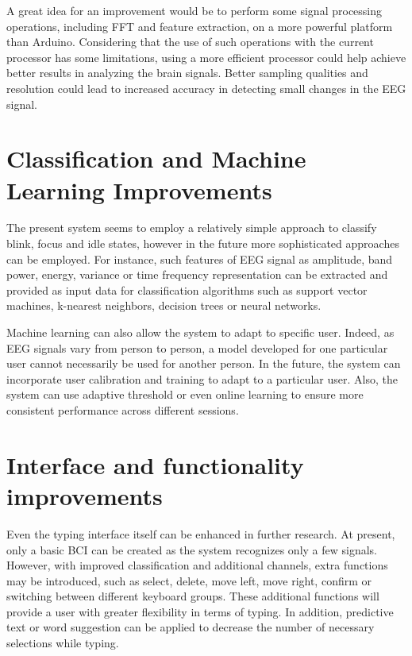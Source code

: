 A great idea for an improvement would be to perform some signal processing operations, including FFT and feature extraction, on a more powerful platform than Arduino. Considering that the use of such operations with the current processor has some limitations, using a more efficient processor could help achieve better results in analyzing the brain signals. Better sampling qualities and resolution could lead to increased accuracy in detecting small changes in the EEG signal.

\section{Classification and Machine Learning Improvements}

The present system seems to employ a relatively simple approach to classify blink, focus and idle states, however in the future more sophisticated approaches can be employed. For instance, such features of EEG signal as amplitude, band power, energy, variance or time frequency representation can be extracted and provided as input data for classification algorithms such as support vector machines, k-nearest neighbors, decision trees or neural networks.

Machine learning can also allow the system to adapt to specific user. Indeed, as EEG signals vary from person to person, a model developed for one particular user cannot necessarily be used for another person. In the future, the system can incorporate user calibration and training to adapt to a particular user. Also, the system can use adaptive threshold or even online learning to ensure more consistent performance across different sessions.

\section{Interface and functionality improvements}

Even the typing interface itself can be enhanced in further research. At present, only a basic BCI can be created as the system recognizes only a few signals. However, with improved classification and additional channels, extra functions may be introduced, such as select, delete, move left, move right, confirm or switching between different keyboard groups. These additional functions will provide a user with greater flexibility in terms of typing. In addition, predictive text or word suggestion can be applied to decrease the number of necessary selections while typing.

